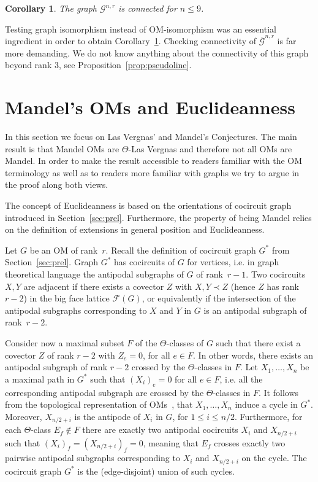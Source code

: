 \documentclass[final,11pt]{article}
\newtheorem{cor}[thm]{Corollary}%
\begin{document}
\begin{cor}\label{cor:94}
The graph $\mathcal{G}^{n,r}$ is connected for $n\leq 9$.
\end{cor}

Testing graph isomorphism instead of OM-isomorphism was an essential ingredient in order to obtain Corollary~\ref{cor:94}. Checking connectivity of $\overline{\mathcal{G}}^{n,r}$ is far more demanding. We do not know anything about the connectivity of this graph beyond rank $3$, see Proposition~\ref{prop:pseudoline}. 

\section{Mandel's OMs and Euclideanness}\label{sec:mandel}

In this section we focus on Las Vergnas' and Mandel's Conjectures. The main result is that Mandel OMs are $\Theta$-Las Vergnas and therefore not all OMs are Mandel. In order to make the result accessible to readers familiar with the OM terminology as well as to readers more familiar with graphs we try to argue in the proof along both views. 

The concept of Euclideanness is based on the orientations of cocircuit graph introduced in Section~\ref{sec:prel}. Furthermore, the property of being Mandel relies on the definition of extensions in general position and Euclideanness.

Let $G$ be an OM of rank~$r$. Recall the definition of cocircuit graph $G^*$ from Section~\ref{sec:prel}.  Graph $G^*$ has cocircuits of $G$ for vertices, i.e. in graph theoretical language the antipodal subgraphs of $G$ of rank~$r-1$.  Two cocircuits $X,Y$ are adjacent if there exists a covector $Z$ with $X,Y \prec Z$ (hence $Z$ has rank $r-2$) in the big face lattice $\mathcal{F}(G)$, or equivalently if the intersection of the antipodal subgraphs corresponding to $X$ and $Y$ in $G$ is an antipodal subgraph of rank~$r-2$.

Consider now  a maximal subset $F$ of the $\Theta$-classes of $G$ such that there exist a covector $Z$ of rank $r-2$ with $Z_e=0$, for all $e\in F$. In other words, there exists an antipodal subgraph of rank $r-2$ crossed by the $\Theta$-classes in $F$. Let $X_1,\ldots,X_n$ be a maximal path in  $G^*$ such that $(X_i)_e=0$ for all $e\in F$, i.e. all the corresponding antipodal subgraph are crossed by the $\Theta$-classes in $F$. It follows from the topological representation of OMs~\cite{Man-82}, that $X_1,\ldots,X_n$ induce a cycle in $G^*$. Moreover, $X_{n/2+i}$ is the antipode of $X_{i}$ in $G$, for $1\leq i \leq n/2$. Furthermore, for each $\Theta$-class $E_f\notin F$ there are exactly two antipodal cocircuits $X_{i}$ and $X_{n/2+i}$ such that $(X_i)_f = (X_{n/2+i})_f=0$, meaning that $E_f$ crosses exactly two pairwise antipodal subgraphs corresponding to $X_{i}$ and $X_{n/2+i}$ on the cycle. The cocircuit graph $G^*$ is the (edge-disjoint) union of such cycles.
\end{document}
